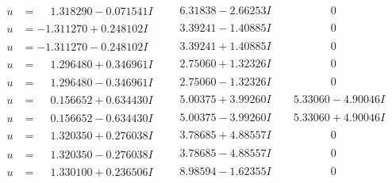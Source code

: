 \documentclass[1p]{elsarticle_modified}
\theoremstyle{definition}
\begin{document}
$$\begin{array}{c|c|c}
\begin{aligned}
u &= \phantom{-}1.318290 - 0.071541 I\end{aligned}
 & \phantom{-}6.31838 - 2.66253 I & \phantom{-0.000000 } 0 \\ \hline\begin{aligned}
u &= -1.311270 + 0.248102 I\end{aligned}
 & \phantom{-}3.39241 - 1.40885 I & \phantom{-0.000000 } 0 \\ \hline\begin{aligned}
u &= -1.311270 - 0.248102 I\end{aligned}
 & \phantom{-}3.39241 + 1.40885 I & \phantom{-0.000000 } 0 \\ \hline\begin{aligned}
u &= \phantom{-}1.296480 + 0.346961 I\end{aligned}
 & \phantom{-}2.75060 + 1.32326 I & \phantom{-0.000000 } 0 \\ \hline\begin{aligned}
u &= \phantom{-}1.296480 - 0.346961 I\end{aligned}
 & \phantom{-}2.75060 - 1.32326 I & \phantom{-0.000000 } 0 \\ \hline\begin{aligned}
u &= \phantom{-}0.156652 + 0.634430 I\end{aligned}
 & \phantom{-}5.00375 + 3.99260 I & \phantom{-}5.33060 - 4.90046 I \\ \hline\begin{aligned}
u &= \phantom{-}0.156652 - 0.634430 I\end{aligned}
 & \phantom{-}5.00375 - 3.99260 I & \phantom{-}5.33060 + 4.90046 I \\ \hline\begin{aligned}
u &= \phantom{-}1.320350 + 0.276038 I\end{aligned}
 & \phantom{-}3.78685 + 4.88557 I & \phantom{-0.000000 } 0 \\ \hline\begin{aligned}
u &= \phantom{-}1.320350 - 0.276038 I\end{aligned}
 & \phantom{-}3.78685 - 4.88557 I & \phantom{-0.000000 } 0 \\ \hline\begin{aligned}
u &= \phantom{-}1.330100 + 0.236506 I\end{aligned}
 & \phantom{-}8.98594 - 1.62355 I & \phantom{-0.000000 } 0 \\ \hline\begin{aligned}

\end{aligned}
\end{array}$$
\end{document}

